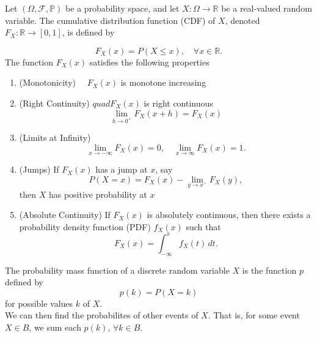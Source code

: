 \documentclass[../main.tex]{subfiles}
\begin{document}
\begin{definition}
    Let \( (\Omega, \mathcal{F}, \mathbb{P}) \) be a probability space, and let \( X: \Omega \to \mathbb{R} \) be a real-valued random variable. The cumulative distribution function (CDF) of \( X \), denoted \( F_X: \mathbb{R} \to [0,1] \), is defined by  

    \[
    F_X(x) = P(X \leq x), \quad \forall x \in \mathbb{R}.
    \]
    The function \( F_X(x) \) satisfies the following properties  
    \begin{enumerate}
        \item (Monotonicity) $\quad F_X(x)$ is monotone increasing
        \item (Right Continuity) $quad F_X(x)$ is right continuous\[
        \lim_{h\to 0^+} F_X(x+h) = F_X(x)
        \]
        \item (Limits at Infinity) \[
            \lim_{x \to -\infty} F_X(x) = 0, \quad \lim_{x \to \infty} F_X(x) = 1.
            \]  
        \item (Jumps) If \( F_X(x) \) has a jump at \( x \), say  
        \[
        P(X = x) = F_X(x) - \lim_{y \to x^-} F_X(y),
        \]  
        then \( X \) has positive probability at \( x \)
        \item (Absolute Continuity) If \( F_X(x) \) is absolutely continuous, then there exists a probability density function (PDF) \( f_X(x) \) such that  
        \[
        F_X(x) = \int_{-\infty}^{x} f_X(t) \, dt.
        \]  
    \end{enumerate} 
\end{definition}






\begin{definition}\label{def:pmf}
The probability mass function of a discrete random variable $X$ is the function
$p$ defined by 
\[
p(k) = P(X=k)
\]
for possible values $k$ of $X$.\\
We can then find the probabilites of other events of $X$. That is, for some event $X\in B$, we 
sum each $p(k)$, $\forall k \in B$. 
\end{definition}
\end{document}

